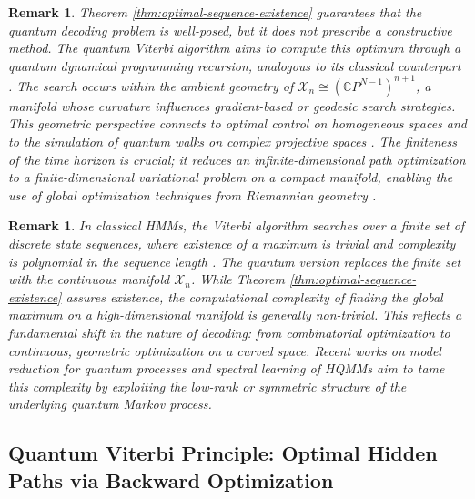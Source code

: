 \documentclass[12pt, reco]{article}
\newtheorem{remark}[theorem]{Remark}
\begin{document}
\begin{remark}
Theorem \ref{thm:optimal-sequence-existence} guarantees that the quantum decoding problem is well-posed, but it does not prescribe a constructive method. The quantum Viterbi algorithm \cite{Li2024, MRDFS22} aims to compute this optimum through a quantum dynamical programming recursion, analogous to its classical counterpart \cite{Rab2002, FV05}. The search occurs within the ambient geometry of \(\mathcal{X}_n \cong (\mathbb{C}P^{N-1})^{n+1}\), a manifold whose curvature  influences gradient-based or geodesic search strategies. This geometric perspective connects to optimal control on homogeneous spaces   and to the simulation of quantum walks on complex projective spaces \cite{Ambainis2003, ApersSarletteTicozzi18}. The finiteness of the time horizon is crucial; it reduces an infinite-dimensional path optimization to a finite-dimensional variational problem on a compact manifold, enabling the use of global optimization techniques from Riemannian geometry \cite{GT25}.
\end{remark}

\begin{remark}
In classical HMMs, the Viterbi algorithm searches over a finite set of discrete state sequences, where existence of a maximum is trivial and complexity is polynomial in the sequence length \cite{V03, Rab2002}. The quantum version replaces the finite set with the continuous manifold \(\mathcal{X}_n\). While Theorem \ref{thm:optimal-sequence-existence} assures existence, the computational complexity of finding the global maximum on a high-dimensional   manifold is generally non-trivial. This reflects a fundamental shift in the nature of decoding: from combinatorial optimization to continuous, geometric optimization on a curved space. Recent works on model reduction for quantum processes \cite{WhiteMahonyBrushe00, GT25} and spectral learning of HQMMs \cite{HsuKakadeZhang12, Srin2017} aim to tame this complexity by exploiting the low-rank or symmetric structure of the underlying quantum Markov process.
\end{remark}


\subsection{Quantum Viterbi Principle: Optimal Hidden Paths via Backward Optimization}
\end{document}
